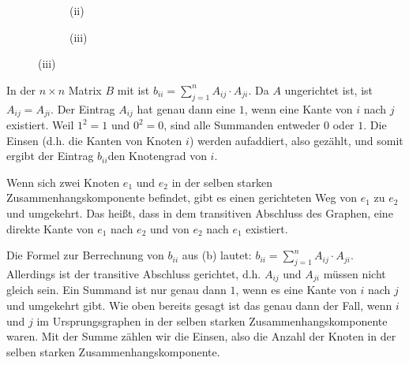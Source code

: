 \documentclass[11pt]{scrartcl}  %
\begin{document}
\begin{compactenum}[(a)]
\begin{figure}[h]
\begin{subfigure}{0.3\textwidth}
      \caption{(ii)}
    \end{subfigure}
    \begin{subfigure}{0.3\textwidth}
      \centering

      \caption{(iii)}
    \end{subfigure}
  \end{figure}

\item In der $n\times n$ Matrix $B$ mit  ist $b_{ii} = \sum_{j=1}^{n} A_{ij} \cdot A_{ji}$. Da $A$ ungerichtet ist, ist $A_{ij} = A_{ji}$. Der Eintrag $A_{ij}$ hat genau dann eine $1$, wenn eine Kante von $i$ nach $j$ existiert. Weil $1^2 = 1$ und $0^2 = 0$, sind alle Summanden entweder $0$ oder $1$. Die Einsen (d.h. die Kanten von Knoten $i$) werden aufaddiert, also gezählt, und somit ergibt der Eintrag $b_{ii}$den Knotengrad von $i$.

\item Wenn sich zwei Knoten $e_1$ und $e_2$ in der selben starken Zusammenhangskomponente befindet, gibt es einen gerichteten Weg von $e_1$ zu $e_2$ und umgekehrt. Das heißt, dass in dem transitiven Abschluss des Graphen, eine direkte Kante von $e_1$ nach $e_2$ und von $e_2$ nach $e_1$ existiert.

Die Formel zur Berrechnung von $b_{ii}$ aus (b) lautet: $b_{ii} = \sum_{j=1}^{n} A_{ij} \cdot A_{ji}$. Allerdings ist der transitive Abschluss gerichtet, d.h. $A_{ij}$ und $A_{ji}$ müssen nicht gleich sein. Ein Summand ist nur genau dann $1$, wenn es eine Kante von $i$ nach $j$ und umgekehrt gibt. Wie oben bereits gesagt ist das genau dann der Fall, wenn $i$ und $j$ im Ursprungsgraphen in der selben starken Zusammenhangskomponente waren. Mit der Summe zählen wir die Einsen, also die Anzahl der Knoten in der selben starken Zusammenhangskomponente.
\end{compactenum}
\end{document}
